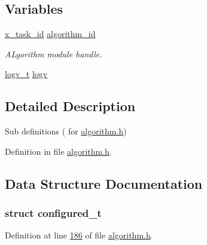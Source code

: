 \subsection*{Variables}
\begin{DoxyCompactItemize}
\item 
\hyperlink{a00036_ad5c3c5fbfd3e4aadf22830395484a71d}{x\+\_\+task\+\_\+id} \hyperlink{a00021_aff3e3d622fcd96787628167d3c1856f9}{algorithm\+\_\+id}
\begin{DoxyCompactList}\small\item\em A\+Lgorithm module handle. \end{DoxyCompactList}\item 
\hyperlink{a00021_d6/da3/a00589}{logv\+\_\+t} \hyperlink{a00021_a2e89c46668b39a17753c238950c9e1ec}{logv}
\end{DoxyCompactItemize}


\subsection{Detailed Description}
Sub definitions ( for \hyperlink{a00021}{algorithm.\+h}) 



Definition in file \hyperlink{a00021_source}{algorithm.\+h}.



\subsection{Data Structure Documentation}
\label{d6/d9c/a00352}
\hypertarget{a00021_d6/d9c/a00352}{}
\subsubsection{struct configured\+\_\+t}


Definition at line \hyperlink{a00021_source_l00186}{186} of file \hyperlink{a00021_source}{algorithm.\+h}.



